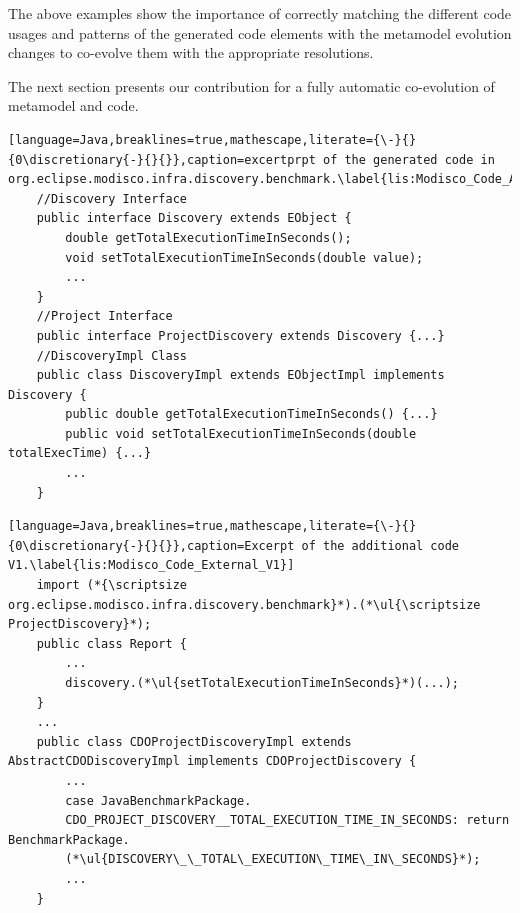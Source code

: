 The above examples show the importance of correctly matching the different code usages and patterns of the generated code elements with the metamodel evolution changes to co-evolve them with the appropriate resolutions. 

The next section presents our contribution for a fully automatic co-evolution of metamodel and code.  

\begin{lstlisting}[language=Java,breaklines=true,mathescape,literate={\-}{}{0\discretionary{-}{}{}},caption=excertprpt of the generated code in org.eclipse.modisco.infra.discovery.benchmark.\label{lis:Modisco_Code_API_V1}]
	//Discovery Interface
	public interface Discovery extends EObject {
		double getTotalExecutionTimeInSeconds();
		void setTotalExecutionTimeInSeconds(double value);
		...
	}
	//Project Interface
	public interface ProjectDiscovery extends Discovery {...}
	//DiscoveryImpl Class
	public class DiscoveryImpl extends EObjectImpl implements Discovery {
		public double getTotalExecutionTimeInSeconds() {...}
		public void setTotalExecutionTimeInSeconds(double totalExecTime) {...}
		...
	}
\end{lstlisting}
\begin{lstlisting}[language=Java,breaklines=true,mathescape,literate={\-}{}{0\discretionary{-}{}{}},caption=Excerpt of the additional code V1.\label{lis:Modisco_Code_External_V1}]
	import (*{\scriptsize org.eclipse.modisco.infra.discovery.benchmark}*).(*\ul{\scriptsize ProjectDiscovery}*);
	public class Report {
		...
		discovery.(*\ul{setTotalExecutionTimeInSeconds}*)(...);
	}
	...
	public class CDOProjectDiscoveryImpl extends AbstractCDODiscoveryImpl implements CDOProjectDiscovery {
		...
		case JavaBenchmarkPackage.
		CDO_PROJECT_DISCOVERY__TOTAL_EXECUTION_TIME_IN_SECONDS: return BenchmarkPackage.
		(*\ul{DISCOVERY\_\_TOTAL\_EXECUTION\_TIME\_IN\_SECONDS}*);
		...
	}
	
	
\end{lstlisting}


